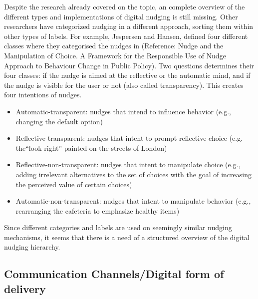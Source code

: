 Despite the research already covered on the topic, an complete overview of the different types and implementations of digital nudging is still missing. Other researchers have categorized nudging in a different approach, sorting them within other types of labels. For example, Jespersen and Hansen, defined four different classes where they categorised the nudges in (Reference: Nudge and the Manipulation of Choice. A Framework for the Responsible Use of Nudge Approach to Behaviour Change in Public Policy). Two questions determines their four classes: if the nudge is aimed at the reflective or the automatic mind, and if the nudge is visible for the user or not (also called transparency). This creates four intentions of nudges. 
\begin{itemize}
\item Automatic-transparent: nudges that intend to influence behavior (e.g., changing the default option)
\item Reflective-transparent: nudges that intent to prompt reflective choice (e.g. the“look right” painted on the streets of London)
\item Reflective-non-transparent: nudges that intent to manipulate choice (e.g., adding irrelevant alternatives to the set of choices with the goal of increasing the perceived value of certain choices)
\item Automatic-non-transparent: nudges that intent to manipulate behavior (e.g., rearranging the cafeteria to emphasize healthy items)
\end{itemize}

Since different categories and labels are used on seemingly similar nudging mechanisms, it seems that there is a need of a structured overview of the digital nudging hierarchy. 


\subsection{Communication Channels/Digital form of delivery}


